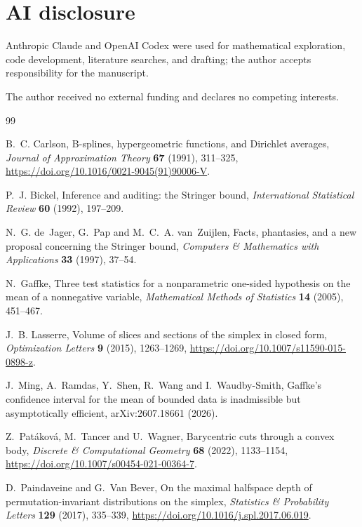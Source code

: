 \documentclass[11pt]{article}
\theoremstyle{definition}
\begin{document}
\section*{AI disclosure}
Anthropic Claude and OpenAI Codex were used for mathematical exploration,
code development, literature searches, and drafting; the author accepts
responsibility for the manuscript.

\noindent The author received no external funding and declares no competing
interests.

\begin{thebibliography}{99}

 B.~C. Carlson, B-splines, hypergeometric functions,
and Dirichlet averages, \emph{Journal of Approximation Theory} \textbf{67}
(1991), 311--325,
\url{https://doi.org/10.1016/0021-9045(91)90006-V}.

 P.~J. Bickel, Inference and auditing: the Stringer
bound, \emph{International Statistical Review} \textbf{60} (1992),
197--209.

 N.~G. de~Jager, G.~Pap and M.~C.~A. van~Zuijlen,
Facts, phantasies, and a new proposal concerning the Stringer bound,
\emph{Computers \& Mathematics with Applications} \textbf{33} (1997),
37--54.

 N.~Gaffke, Three test statistics for a nonparametric
one-sided hypothesis on the mean of a nonnegative variable,
\emph{Mathematical Methods of Statistics} \textbf{14} (2005), 451--467.

 J.~B. Lasserre, Volume of slices and sections of the
simplex in closed form, \emph{Optimization Letters} \textbf{9} (2015),
1263--1269, \url{https://doi.org/10.1007/s11590-015-0898-z}.

 J.~Ming, A.~Ramdas, Y.~Shen, R.~Wang and
I.~Waudby-Smith, Gaffke's confidence interval for the mean of bounded data
is inadmissible but asymptotically efficient, arXiv:2607.18661 (2026).

 Z.~Pat\'akov\'a, M.~Tancer and U.~Wagner,
Barycentric cuts through a convex body, \emph{Discrete \& Computational
Geometry} \textbf{68} (2022), 1133--1154,
\url{https://doi.org/10.1007/s00454-021-00364-7}.

 D.~Paindaveine and G.~Van Bever,
On the maximal halfspace depth of permutation-invariant distributions on
the simplex, \emph{Statistics \& Probability Letters} \textbf{129}
(2017), 335--339, \url{https://doi.org/10.1016/j.spl.2017.06.019}.


\end{thebibliography}
\end{document}
